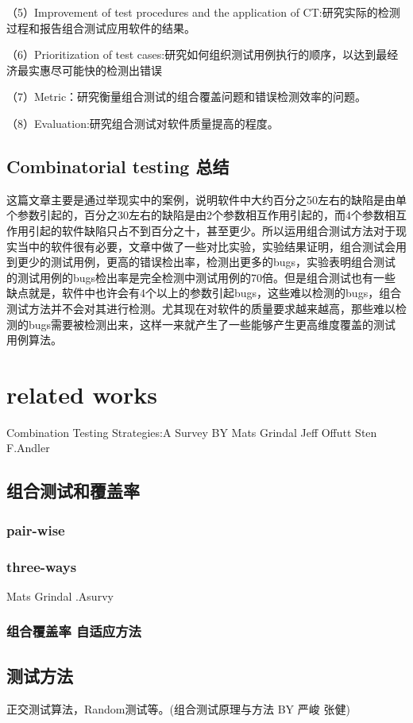 \documentclass[10pt,journal,letterpaper,compsoc]{IEEEtran}
\begin{document}
\begin{CJK}{UTF8}{gkai}
（5）Improvement of test procedures and the application of CT:研究实际的检测过程和报告组合测试应用软件的结果。

（6）Prioritization of test cases:研究如何组织测试用例执行的顺序，以达到最经济最实惠尽可能快的检测出错误

（7）Metric：研究衡量组合测试的组合覆盖问题和错误检测效率的问题。

（8）Evaluation:研究组合测试对软件质量提高的程度。
	\subsection{Combinatorial testing 总结}
这篇文章主要是通过举现实中的案例，说明软件中大约百分之50左右的缺陷是由单个参数引起的，百分之30左右的缺陷是由2个参数相互作用引起的，而4个参数相互作用引起的软件缺陷只占不到百分之十，甚至更少。所以运用组合测试方法对于现实当中的软件很有必要，文章中做了一些对比实验，实验结果证明，组合测试会用到更少的测试用例，更高的错误检出率，检测出更多的bugs，实验表明组合测试的测试用例的bugs检出率是完全检测中测试用例的70倍。但是组合测试也有一些缺点就是，软件中也许会有4个以上的参数引起bugs，这些难以检测的bugs，组合测试方法并不会对其进行检测。尤其现在对软件的质量要求越来越高，那些难以检测的bugs需要被检测出来，这样一来就产生了一些能够产生更高维度覆盖的测试用例算法。
\section{related works}
Combination Testing Strategies:A Survey BY Mats Grindal Jeff Offutt Sten F.Andler
\subsection{ 组合测试和覆盖率}
	\subsubsection{pair-wise}
	\subsubsection{three-ways} Mats Grindal .Asurvy 
	\subsubsection{组合覆盖率 自适应方法}
\subsection{测试方法}
正交测试算法，Random测试等。(组合测试原理与方法 BY 严峻 张健)

\end{CJK}
\end{document}

